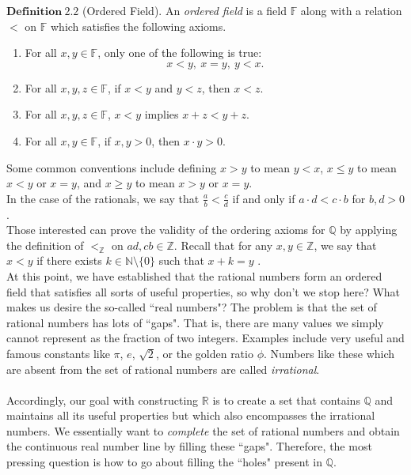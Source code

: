 \documentclass[12pt]{article}
\theoremstyle{definition}
\theoremstyle{remark}
\begin{document}
\noindent $\mathbf{Definition\ 2.2}$ (Ordered Field)\cite[pg.3 \& 7]{old}.
        An \textit{ordered field} is a field $\mathbb{F}$ along with a relation $<$ on $\mathbb{F}$ which satisfies the following axioms.
	    \begin{enumerate}
	        \item For all $x,y\in\mathbb{F}$, only one of the following is true:
            $$x<y,\ x=y,\ y<x.$$
	        \item For all $x,y,z\in\mathbb{F}$, if $x<y$ and $y<z$, then $x<z$.
	        \item For all $x,y,z\in\mathbb{F}$, $x<y$ implies $x+z<y+z$.
                \item For all $x,y\in\mathbb{F}$, if $x,y>0$, then $x\cdot y>0$.
	    \end{enumerate}

        
\noindent Some common conventions include defining $x>y$ to mean $y<x$, $x\leq y$ to mean $x<y$ or $x=y$, and $x\geq y$ to mean $x>y$ or $x=y$.\\

\noindent In the case of the rationals, we say that $\frac{a}{b}<\frac{c}{d}$ if and only if $a\cdot d<c\cdot b$ for $b,d>0$ \cite[pg. 10]{approaches}.\\ 
Those interested can prove the validity of the ordering axioms for $\mathbb{Q}$ by applying the definition of $<_\mathbb{Z}$ on $ad,cb\in\mathbb{Z}$. Recall that for any $x,y\in\mathbb{Z}$, we say that $x<y$ if there exists $k\in\mathbb{N}\setminus\{0\}$ such that $x+k=y$ \cite[pg.11]{Luke-1A}.\\

\noindent At this point, we have established that the rational numbers form an ordered field that satisfies all sorts of useful properties, so why don't we stop here? What makes us desire the so-called 
``real numbers"? The problem is that the set of rational numbers has lots of ``gaps". That is, there are many values we simply cannot represent as the fraction of two integers. Examples include very useful and famous constants like $\pi$, $e$, $\sqrt{2}$, or the golden ratio $\phi$. Numbers like these which are absent from the set of rational numbers are called \textit{irrational}.\\\\
Accordingly, our goal with constructing $\mathbb{R}$ is to create a set that contains $\mathbb{Q}$ and maintains all its useful properties but which also encompasses the irrational numbers. We essentially want to \textit{complete} the set of rational numbers and obtain the continuous real number line by filling these ``gaps". Therefore, the most pressing question is how to go about filling the ``holes" present in $\mathbb{Q}$.
\end{document}
